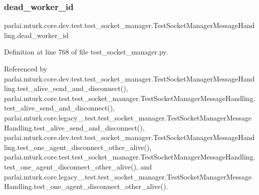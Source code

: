 \mbox{\label{classparlai_1_1mturk_1_1core_1_1dev_1_1test_1_1test__socket__manager_1_1TestSocketManagerMessageHandling_aa580dd35ffd8cb2347bf7ca777fe6f0b}} 
\subsubsection{\texorpdfstring{dead\+\_\+worker\+\_\+id}{dead\_worker\_id}}
{\footnotesize\ttfamily parlai.\+mturk.\+core.\+dev.\+test.\+test\+\_\+socket\+\_\+manager.\+Test\+Socket\+Manager\+Message\+Handling.\+dead\+\_\+worker\+\_\+id}



Definition at line 768 of file test\+\_\+socket\+\_\+manager.\+py.



Referenced by parlai.\+mturk.\+core.\+dev.\+test.\+test\+\_\+socket\+\_\+manager.\+Test\+Socket\+Manager\+Message\+Handling.\+test\+\_\+alive\+\_\+send\+\_\+and\+\_\+disconnect(), parlai.\+mturk.\+core.\+test.\+test\+\_\+socket\+\_\+manager.\+Test\+Socket\+Manager\+Message\+Handling.\+test\+\_\+alive\+\_\+send\+\_\+and\+\_\+disconnect(), parlai.\+mturk.\+core.\+legacy\+\_.\+test.\+test\+\_\+socket\+\_\+manager.\+Test\+Socket\+Manager\+Message\+Handling.\+test\+\_\+alive\+\_\+send\+\_\+and\+\_\+disconnect(), parlai.\+mturk.\+core.\+dev.\+test.\+test\+\_\+socket\+\_\+manager.\+Test\+Socket\+Manager\+Message\+Handling.\+test\+\_\+one\+\_\+agent\+\_\+disconnect\+\_\+other\+\_\+alive(), parlai.\+mturk.\+core.\+test.\+test\+\_\+socket\+\_\+manager.\+Test\+Socket\+Manager\+Message\+Handling.\+test\+\_\+one\+\_\+agent\+\_\+disconnect\+\_\+other\+\_\+alive(), and parlai.\+mturk.\+core.\+legacy\+\_.\+test.\+test\+\_\+socket\+\_\+manager.\+Test\+Socket\+Manager\+Message\+Handling.\+test\+\_\+one\+\_\+agent\+\_\+disconnect\+\_\+other\+\_\+alive().

